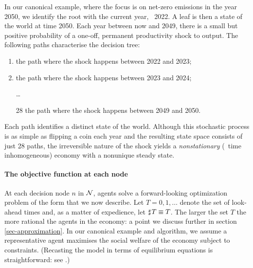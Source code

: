 \documentclass[12pt,a4paper,twoside, draft]{article}
\begin{document}
\begin{example}\label{eg-irreversible}
   In our canonical example, where the focus is on net-zero emissions in the
   year 2050, we identify the root with the current year, \eg~2022.
   A leaf is then a state of the world at time 2050.
   Each year between now and 2049, there is a small but positive probability of
   a one-off, permanent productivity shock to output.
   The following paths characterise the decision tree:
   \begin{enumerate}[1]
      \item the path where the shock happens between 2022 and 2023;
      \item the path where the shock happens between 2023 and 2024;
      \item[] \dots
      \item[28] the path where the shock happens between 2049 and 2050.
   \end{enumerate}
   Each path identifies a distinct state of the world.
   Although this stochastic process is as simple as flipping a coin
   each year and the resulting state space consists of just 28 paths,
   the irreversible nature of the shock yields a
   \emph{nonstationary} (\ie~time inhomogeneous) economy with a nonunique
   steady state.
\end{example}

\paragraph{The objective function at each node}
At each decision node $n$ in $\mathcal N$, agents solve a forward-looking
optimization problem of the form that we now describe.
Let $T = 0, 1, \dots$ denote the set of look-ahead times and, as a matter of
expedience, let $\mathbin{\sharp}\hskip1pt T \equiv T$.
The larger the set $T$ the more rational the agents in the economy: a point we
discuss further in section \ref{sec-approximation}.
In our canonical example and algorithm, we assume
a representative agent maximises the social welfare of the economy subject to
constraints.
(Recasting the model in terms of equilibrium equations is straightforward:
see \citet[Algorithm 2]{CJ}.)
\end{document}
